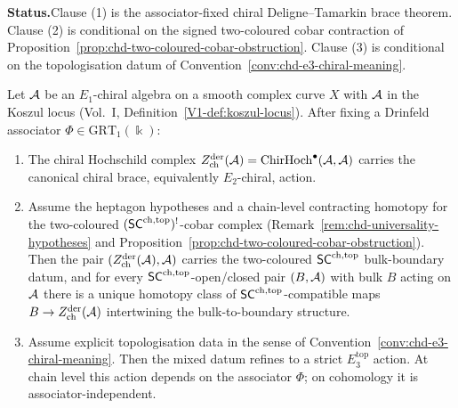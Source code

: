 \begin{theorem}%
\label{thm:chiral-higher-deligne}%
%
%
\noindent\textbf{Status.}\enspace Clause \textup{(1)} is the
associator-fixed chiral Deligne--Tamarkin brace theorem. Clause
\textup{(2)} is conditional on the signed two-coloured cobar
contraction of Proposition~\ref{prop:chd-two-coloured-cobar-obstruction}.
Clause \textup{(3)} is conditional on the topologisation datum of
Convention~\ref{conv:chd-e3-chiral-meaning}.

Let $\mathcal{A}$ be an $E_1$-chiral algebra on a smooth complex curve $X$ with
$\mathcal{A}$ in the Koszul locus (Vol.~I, Definition~\ref*{V1-def:koszul-locus}).
After fixing a Drinfeld associator $\Phi \in \mathrm{GRT}_1(\Bbbk)$:
\begin{enumerate}
\item The chiral Hochschild complex
$Z^{\mathrm{der}}_{\mathrm{ch}}(\mathcal{A}) = \mathrm{ChirHoch}^\bullet(\mathcal{A},\mathcal{A})$
carries the canonical chiral brace, equivalently $E_2$-chiral,
action.
\item Assume the heptagon hypotheses and a chain-level contracting
homotopy for the two-coloured $(\mathsf{SC}^{\mathrm{ch},\mathrm{top}})^!$-cobar complex
(Remark~\ref{rem:chd-universality-hypotheses} and
Proposition~\ref{prop:chd-two-coloured-cobar-obstruction}). Then the pair
\((Z^{\mathrm{der}}_{\mathrm{ch}}(\mathcal{A}),\mathcal{A})\) carries the
two-coloured $\mathsf{SC}^{\mathrm{ch},\mathrm{top}}$ bulk-boundary datum, and for every
$\mathsf{SC}^{\mathrm{ch},\mathrm{top}}$-open/closed pair $(B,\mathcal{A})$ with bulk $B$ acting on
$\mathcal{A}$ there is a unique homotopy class of $\mathsf{SC}^{\mathrm{ch},\mathrm{top}}$-compatible maps
$B\to Z^{\mathrm{der}}_{\mathrm{ch}}(\mathcal{A})$ intertwining the
bulk-to-boundary structure.
\item Assume explicit topologisation data in the sense of
Convention~\ref{conv:chd-e3-chiral-meaning}. Then the mixed datum
refines to a strict $E_3^{\mathrm{top}}$ action. At chain level this
action depends on the associator $\Phi$; on cohomology it is
associator-independent.
\end{enumerate}
\end{theorem}

